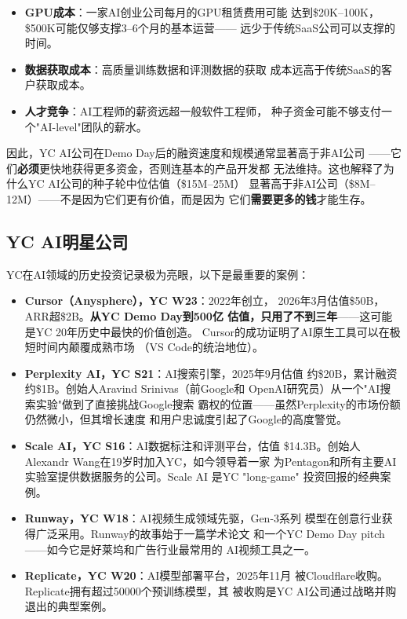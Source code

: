 \begin{itemize}
  \item \textbf{GPU成本}：一家AI创业公司每月的GPU租赁费用可能
    达到\$20K--100K，\$500K可能仅够支撑3--6个月的基本运营——
    远少于传统SaaS公司可以支撑的时间。
  \item \textbf{数据获取成本}：高质量训练数据和评测数据的获取
    成本远高于传统SaaS的客户获取成本。
  \item \textbf{人才竞争}：AI工程师的薪资远超一般软件工程师，
    种子资金可能不够支付一个"AI-level"团队的薪水。
\end{itemize}

因此，YC AI公司在Demo Day后的融资速度和规模通常显著高于非AI公司
——它们\textbf{必须}更快地获得更多资金，否则连基本的产品开发都
无法维持。这也解释了为什么YC AI公司的种子轮中位估值（\$15M--25M）
显著高于非AI公司（\$8M--12M）——不是因为它们更有价值，而是因为
它们\textbf{需要更多的钱}才能生存。

\subsection{YC AI明星公司}
\label{subsec:fund-yc-stars}

YC在AI领域的历史投资记录极为亮眼，以下是最重要的案例：

\begin{itemize}
  \item \textbf{Cursor（Anysphere），YC W23}：2022年创立，
    2026年3月估值\$50B，ARR超\$2B。\textbf{从YC Demo Day到500亿
    估值，只用了不到三年}——这可能是YC 20年历史中最快的价值创造。
    Cursor的成功证明了AI原生工具可以在极短时间内颠覆成熟市场
    （VS Code的统治地位）。
  \item \textbf{Perplexity AI，YC S21}：AI搜索引擎，2025年9月估值
    约\$20B，累计融资约\$1B。创始人Aravind Srinivas（前Google和
    OpenAI研究员）从一个"AI搜索实验"做到了直接挑战Google搜索
    霸权的位置——虽然Perplexity的市场份额仍然微小，但其增长速度
    和用户忠诚度引起了Google的高度警觉。
  \item \textbf{Scale AI，YC S16}：AI数据标注和评测平台，估值
    \$14.3B。创始人Alexandr Wang在19岁时加入YC，如今领导着一家
    为Pentagon和所有主要AI实验室提供数据服务的公司。Scale AI
    是YC "long-game" 投资回报的经典案例。
  \item \textbf{Runway，YC W18}：AI视频生成领域先驱，Gen-3系列
    模型在创意行业获得广泛采用。Runway的故事始于一篇学术论文
    和一个YC Demo Day pitch——如今它是好莱坞和广告行业最常用的
    AI视频工具之一。
  \item \textbf{Replicate，YC W20}：AI模型部署平台，2025年11月
    被Cloudflare收购。Replicate拥有超过50000个预训练模型，其
    被收购是YC AI公司通过战略并购退出的典型案例。
\end{itemize}

